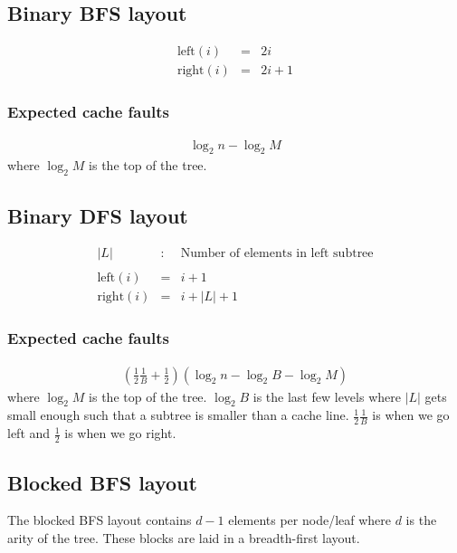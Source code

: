 \subsection{Binary BFS layout}

\begin{eqnarray*}
\mathrm{left}(i) & = & 2i \\
\mathrm{right}(i) & = & 2i + 1
\end{eqnarray*}

\subsubsection*{Expected cache faults}

\begin{eqnarray*}
\log_2 n - \log_2 M 
\end{eqnarray*}
where $\log_2 M$ is the top of the tree.

\subsection{Binary DFS layout}

\begin{eqnarray*}
|L| & : & \textrm{Number of elements in left subtree} \\
\\
\mathrm{left}(i) & = & i + 1 \\
\mathrm{right}(i) & = & i + |L| + 1
\end{eqnarray*}

\subsubsection*{Expected cache faults}

\begin{eqnarray*}
(\frac{1}{2}\frac{1}{B} + \frac{1}{2})(\log_2 n - \log_2 B - \log_2 M) 
\end{eqnarray*}
where $\log_2 M$ is the top of the tree. $\log_2 B$ is the last few levels where $|L|$ gets small enough such that a subtree is smaller than a cache line. $\frac{1}{2}\frac{1}{B}$ is when we go left and $\frac{1}{2}$ is when we go right.

\subsection{Blocked BFS layout}

The blocked BFS layout contains $d - 1$ elements per node/leaf where $d$ is the arity of the tree. These blocks are laid in a breadth-first layout.

